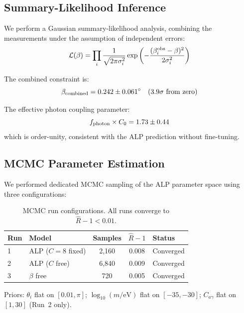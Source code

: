 \documentclass[a4paper,11pt]{article}
\begin{document}
\subsection{Summary-Likelihood Inference}

We perform a Gaussian summary-likelihood analysis, combining the measurements under the assumption of independent errors:
\begin{equation}\label{eq:likelihood}
\mathcal{L}(\beta) = \prod_i \frac{1}{\sqrt{2\pi\sigma_i^2}} \exp\left(-\frac{(\beta_i^{\rm obs} - \beta)^2}{2\sigma_i^2}\right)
\end{equation}

The combined constraint is:
\begin{equation}\label{eq:combined}
\beta_{\rm combined} = 0.242 \pm 0.061^\circ \quad (3.9\sigma\text{ from zero})
\end{equation}

The effective photon coupling parameter:
\begin{equation}\label{eq:coupling}
f_{\rm photon} \times C_0 = 1.73 \pm 0.44
\end{equation}
which is order-unity, consistent with the ALP prediction without fine-tuning.

\subsection{MCMC Parameter Estimation}\label{sec:mcmc}

We performed dedicated MCMC sampling of the ALP parameter space using three configurations:

\begin{table}[h]
\centering
\small
\begin{tabular}{llccl}
\toprule
Run & Model & Samples & $\hat{R}-1$ & Status \\
\midrule
1 & ALP ($C=8$ fixed) & 2{,}160 & 0.008 & Converged \\
2 & ALP ($C$ free) & 6{,}840 & 0.009 & Converged \\
3 & $\beta$ free & 720 & 0.005 & Converged \\
\bottomrule
\end{tabular}
\caption{MCMC run configurations. All runs converge to $\hat{R}-1 < 0.01$.}
\end{table}

\noindent Priors: $\theta_i$ flat on $[0.01, \pi]$; $\log_{10}(m/\text{eV})$ flat on $[-35, -30]$; $C_{a\gamma}$ flat on $[1, 30]$ (Run~2 only).
\end{document}
